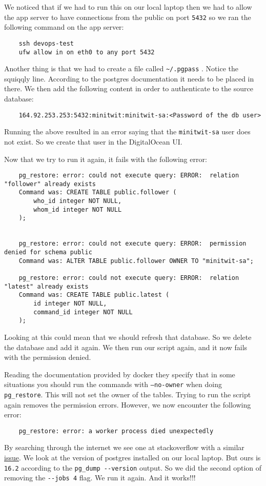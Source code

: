 We noticed that if we had to run this on our local laptop then we had to allow the app server to have connections from the public on port \texttt{5432} so we ran the following command on the app server:
\begin{verbatim}
    ssh devops-test
    ufw allow in on eth0 to any port 5432
\end{verbatim}

Another thing is that we had to create a file called \texttt{\textasciitilde{}/.pgpass} . Notice the squiqqly line. According to the postgres documentation it needs to be placed in there. We then add the following content in order to authenticate to the source database:
\begin{verbatim}
    164.92.253.253:5432:minitwit:minitwit-sa:<Password of the db user>
\end{verbatim}

Running the above resulted in an error saying that the \texttt{minitwit-sa} user does not exist. So we create that user in the DigitalOcean UI.

Now that we try to run it again, it fails with the following error:
\begin{verbatim}
    pg_restore: error: could not execute query: ERROR:  relation "follower" already exists
    Command was: CREATE TABLE public.follower (
        who_id integer NOT NULL,
        whom_id integer NOT NULL
    );


    pg_restore: error: could not execute query: ERROR:  permission denied for schema public
    Command was: ALTER TABLE public.follower OWNER TO "minitwit-sa";

    pg_restore: error: could not execute query: ERROR:  relation "latest" already exists
    Command was: CREATE TABLE public.latest (
        id integer NOT NULL,
        command_id integer NOT NULL
    );
\end{verbatim}

Looking at this could mean that we should refresh that database. So we delete the database and add it again. We then run our script again, and it now fails with the permission denied.

Reading the documentation provided by docker they specify that in some situations you should run the commands with \texttt{—no-owner} when doing \texttt{pg\_restore}. This will not set the owner of the tables. Trying to run the script again removes the permission errors. However, we now encounter the following error:

\begin{verbatim}
    pg_restore: error: a worker process died unexpectedly
\end{verbatim}
By searching through the internet we see one at stackoverflow with a similar \href{https://dba.stackexchange.com/questions/257398/pg-restore-with-jobs-flag-results-in-pg-restore-error-a-worker-process-di}{issue}. We look at the version of postgres installed on our local laptop. But ours is \texttt{16.2} according to the \texttt{pg\_dump\ -\/-version} output. So we did the second option of removing the \texttt{-\/-jobs\ 4} flag. We run it again. And it works!!!

